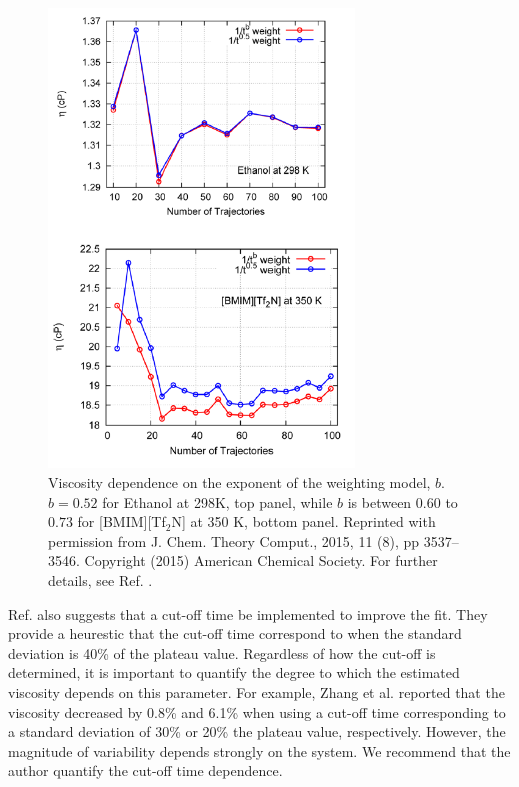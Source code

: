 \documentclass[9pt,bestpractices]{livecoms}
\begin{document}

\begin{figure}[htb!]
	\centering
	\includegraphics[width=3.2in]{ZhangFig7_12.png}
	\caption{Viscosity dependence on the exponent of the weighting model, $b$. $b = 0.52$ for Ethanol at 298K, top panel, while $b$ is between $0.60$ to $0.73$ for [BMIM][Tf$_2$N] at 350 K, bottom panel. Reprinted with permission from J. Chem. Theory Comput., 2015, 11 (8), pp 3537–3546. Copyright (2015) American Chemical Society. For further details, see Ref. \cite{Zhang2015}.}
	\label{fig:ZhangFig7_12}
\end{figure}

Ref. \cite{Zhang2015} also suggests that a cut-off time be implemented to improve the fit. They provide a heurestic that the cut-off time correspond to when the standard deviation is 40\% of the plateau value. Regardless of how the cut-off is determined, it is important to quantify the degree to which the estimated viscosity depends on this parameter. For example, Zhang et al. reported that the viscosity decreased by 0.8\% and 6.1\% when using a cut-off time corresponding to a standard deviation of 30\% or 20\% the plateau value, respectively. However, the magnitude of variability depends strongly on the system. We recommend that the author quantify the cut-off time dependence.
\end{document}
